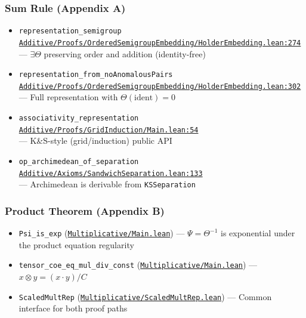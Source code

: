 \documentclass[11pt]{article}
\theoremstyle{definition}
\theoremstyle{remark}
\begin{document}
\subsubsection*{Sum Rule (Appendix A)}
\begin{itemize}
\item \texttt{representation\_semigroup}\\
      \href{https://github.com/zariuq/ks-foundations-of-inference/blob/main/KnuthSkilling/Additive/Proofs/OrderedSemigroupEmbedding/HolderEmbedding.lean\#L214}{\texttt{Additive/Proofs/OrderedSemigroupEmbedding/HolderEmbedding.lean:274}}\\
      --- $\exists \Theta$ preserving order and addition (identity-free)
\item \texttt{representation\_from\_noAnomalousPairs}\\
      \href{https://github.com/zariuq/ks-foundations-of-inference/blob/main/KnuthSkilling/Additive/Proofs/OrderedSemigroupEmbedding/HolderEmbedding.lean\#L242}{\texttt{Additive/Proofs/OrderedSemigroupEmbedding/HolderEmbedding.lean:302}}\\
      --- Full representation with $\Theta(\text{ident}) = 0$
\item \texttt{associativity\_representation}\\
      \href{https://github.com/zariuq/ks-foundations-of-inference/blob/main/KnuthSkilling/Additive/Proofs/GridInduction/Main.lean\#L54}{\texttt{Additive/Proofs/GridInduction/Main.lean:54}}\\
      --- K\&S-style (grid/induction) public API
\item \texttt{op\_archimedean\_of\_separation}\\
      \href{https://github.com/zariuq/ks-foundations-of-inference/blob/main/KnuthSkilling/Additive/Axioms/SandwichSeparation.lean\#L100}{\texttt{Additive/Axioms/SandwichSeparation.lean:133}}\\
      --- Archimedean is derivable from \texttt{KSSeparation}
\end{itemize}

\subsubsection*{Product Theorem (Appendix B)}
\begin{itemize}
\item \texttt{Psi\_is\_exp} (\href{https://github.com/zariuq/ks-foundations-of-inference/blob/main/KnuthSkilling/Multiplicative/Main.lean}{\texttt{Multiplicative/Main.lean}}) --- $\Psi = \Theta^{-1}$ is exponential under the product equation regularity
\item \texttt{tensor\_coe\_eq\_mul\_div\_const} (\href{https://github.com/zariuq/ks-foundations-of-inference/blob/main/KnuthSkilling/Multiplicative/Main.lean}{\texttt{Multiplicative/Main.lean}}) --- $x \otimes y = (x \cdot y)/C$
\item \texttt{ScaledMultRep} (\href{https://github.com/zariuq/ks-foundations-of-inference/blob/main/KnuthSkilling/Multiplicative/ScaledMultRep.lean}{\texttt{Multiplicative/ScaledMultRep.lean}}) --- Common interface for both proof paths
\end{itemize}
\end{document}
